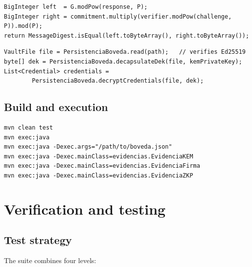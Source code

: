 \documentclass[11pt,a4paper]{article}
\begin{document}
\begin{lstlisting}[style=java,caption={Schnorr verification.},label={lst:schnorr}]
BigInteger left  = G.modPow(response, P);
BigInteger right = commitment.multiply(verifier.modPow(challenge, P)).mod(P);
return MessageDigest.isEqual(left.toByteArray(), right.toByteArray());
\end{lstlisting}

\begin{lstlisting}[style=java,caption={Signature-first loading and DEK decapsulation.},label={lst:load}]
VaultFile file = PersistenciaBoveda.read(path);   // verifies Ed25519
byte[] dek = PersistenciaBoveda.decapsulateDek(file, kemPrivateKey);
List<Credential> credentials =
        PersistenciaBoveda.decryptCredentials(file, dek);
\end{lstlisting}

\subsection{Build and execution}

\begin{lstlisting}[style=bash,caption={Build, test and run commands.},label={lst:commands}]
mvn clean test
mvn exec:java
mvn exec:java -Dexec.args="/path/to/boveda.json"
mvn exec:java -Dexec.mainClass=evidencias.EvidenciaKEM
mvn exec:java -Dexec.mainClass=evidencias.EvidenciaFirma
mvn exec:java -Dexec.mainClass=evidencias.EvidenciaZKP
\end{lstlisting}

\section{Verification and testing}\label{sec:verification}

\subsection{Test strategy}

The suite combines four levels:
\end{document}
